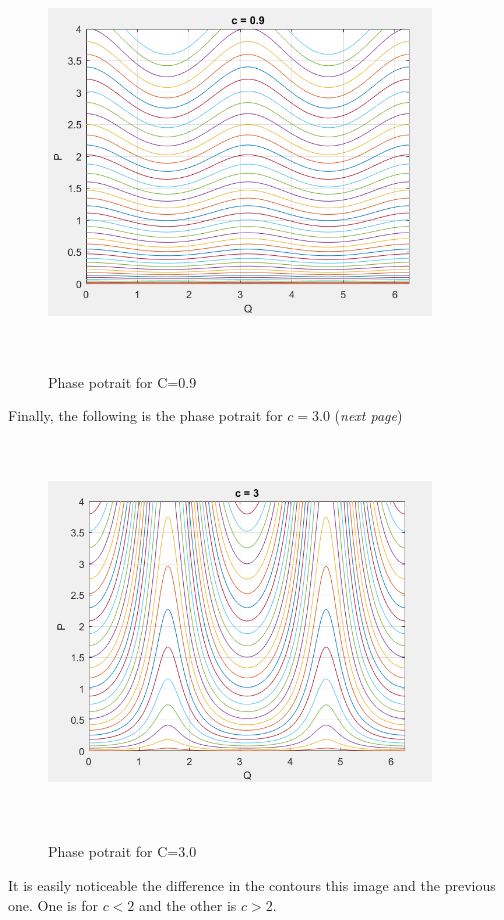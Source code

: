 \documentclass{article}
\begin{document}
\begin{figure}[!htb]
    \centering
    \includegraphics[width=4.0in,height=4.0in,keepaspectratio]{PotraitC0p9.PNG}
    \label{fig:C0p9}
    \caption{Phase potrait for C=0.9}
\end{figure}

\justify
Finally, the following is the phase potrait for $c=3.0$ (\textit{next page})
\begin{figure}[!htb]
    \centering
    \includegraphics[width=4.0in,height=4.0in,keepaspectratio]{PotraitC3.PNG}
    \label{fig:C0p9}
    \caption{Phase potrait for C=3.0}
\end{figure}

\justify

It is easily noticeable the difference in the contours this image and the previous one. One is for $c < 2$ and the other is $c > 2$.
\end{document}
